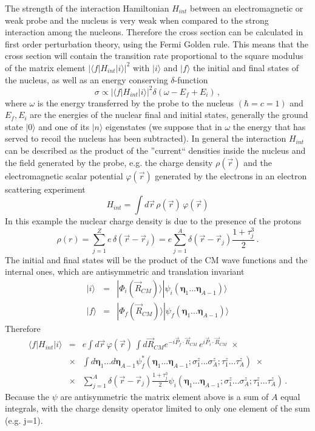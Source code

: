 The strength of the interaction Hamiltonian $H_{int}$ between an electromagnetic or weak probe and the nucleus is very weak when
compared to the strong interaction among the nucleons. Therefore the cross section can be calculated in first order 
perturbation theory, using the 
Fermi Golden rule. This means that the cross section will contain the transition rate proportional to the square modulus of the 
matrix element $ |\langle f|H_{int}|i\rangle|^2$ with $|i\rangle$ and $|f\rangle$ the initial and final states of the nucleus, 
as well as an energy conserving $\delta$-function
\begin{equation}
 \sigma\propto|\langle f|H_{int}|i\rangle|^2 \delta(\omega-E_f+E_i)\,,
\end{equation}
where $\omega$ is the energy transferred by the probe to the nucleus $(\hbar=c=1)$ and $E_f,E_i$ are the energies of the nuclear 
final and initial states, generally the ground state $|0\rangle$ and one of its $|n\rangle$ eigenstates (we suppose 
that in $\omega$ the  energy 
that has served to recoil the nucleus has been subtracted). 
In general the interaction $H_{int}$ can be described as the product of the ''current`` densities inside the nucleus  
and the field generated  by the probe, e.g. the charge density $\rho(\vec r)$ and the electromagnetic scalar potential $\varphi(\vec r)$
generated by the electrons in an electron scattering experiment
\begin{equation}
 H_{int}=\int d\vec r\,\rho(\vec r)\,\varphi(\vec r)
\end{equation}
In this example the nuclear  charge density is due to the presence of the protons
\begin{equation}
\rho(r)=\sum_{j=1}^Z e\, \delta(\vec r-\vec r_j)=e \sum_{j=1}^A  \delta(\vec r-\vec r_j) \frac{1+\tau_j^3}{2}\,.
\end{equation}
The initial and final states will be the product of the CM wave functions 
and the internal ones, which are antisymmetric and translation invariant 
\begin{eqnarray}
|i\rangle &=& |\Phi_i(\vec R_{CM})\rangle|\psi_i(\bm{\eta}_1...\bm{\eta}_{A-1})\rangle\\
|f\rangle &=& |\Phi_f(\vec R_{CM})\rangle|\psi_f(\bm{\eta}_1...\bm{\eta}_{A-1})\rangle
\end{eqnarray}
Therefore 
\begin{eqnarray}\label{ME} 
 \langle f|H_{int}|i\rangle &=& e \int d\vec r \,\varphi(\vec r)\,\int d\vec R_{CM}  
 e^{-i\vec P_f\cdot\vec R_{CM}}\,e^{i \vec P_i\cdot\vec R_{CM}}
  \,\,\times \nonumber\\
 &\times& \int d\bm{\eta}_1...d\bm{\eta}_{A-1}\psi^*_f(\bm{\eta}_1...\bm{\eta}_{A-1}; 
 \sigma_1^z...\sigma_A^z;\tau_1^z...\tau_A^z)\,\,\times \nonumber\\
 &\times&\sum_{j=1}^A  \delta(\vec r-\vec r_j)\frac{1+\tau_j^3}{2} \psi_i(\bm{\eta}_1...\bm{\eta}_{A-1}; 
 \sigma_1^z...\sigma_A^z;\tau_1^z...\tau_A^z)\,.
\end{eqnarray}
Because the $\psi$ are antisymmetric the matrix element above is a sum of $A$ equal integrals, with the charge density operator 
limited to only one element of the sum (e.g. j=1). 

